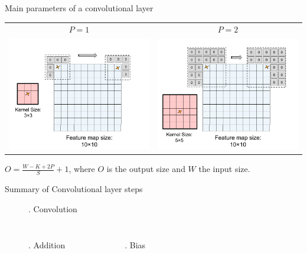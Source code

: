 \documentclass[handout, 10pt]{beamer}
\begin{document}
\begin{frame}[t]{Main parameters of a convolutional layer}
\begin{itemize}
    {
    {\centering
\begin{tabular}{cc}
    $P=1$ & $P=2$ \\
    \includegraphics[trim={0 0 1.5cm 0}, clip, width=.45\textwidth]{fig/L2/pad3.png}&
    \includegraphics[trim={0 0 1.5cm 0}, clip, width=.45\textwidth]{fig/L2/pad5.png}\\
    \end{tabular}
    }

}
    
\end{itemize}
    \pause
    {\footnotesize
    $O = \frac{W - K +2P}{S} + 1$, where $O$ is the output size and $W$ the input size.
    }
\end{frame}


\begin{frame}{Summary of Convolutional layer steps}
    \begin{figure}
        . Convolution
    \end{figure}
    \pause
    \vspace{-2em}
    \begin{columns}[t]
    \begin{figure}
        . Addition

    \end{figure}
    
       \pause
    \begin{figure}
        . Bias\\
    \end{figure}
    \end{columns}
\end{frame}
\end{document}
